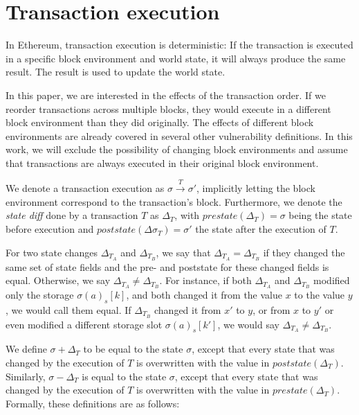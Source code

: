 \documentclass[draft,final]{vutinfth} %
\begin{document}
\section{Transaction execution}

In Ethereum, transaction execution is deterministic: If the transaction is executed in a specific block environment and world state, it will always produce the same result. The result is used to update the world state.

In this paper, we are interested in the effects of the transaction order. If we reorder transactions across multiple blocks, they would execute in a different block environment than they did originally. The effects of different block environments are already covered in several other vulnerability definitions. In this work, we will exclude the possibility of changing block environments and assume that transactions are always executed in their original block environment.

We denote a transaction execution as $\sigma \xrightarrow{T} \sigma\prime$, implicitly letting the block environment correspond to the transaction's block. Furthermore, we denote the \emph{state diff} done by a transaction $T$ as $\Delta_T$, with $prestate(\Delta_T) = \sigma$ being the state before execution and $poststate(\Delta\sigma_T) = \sigma\prime$ the state after the execution of $T$.

For two state changes $\Delta_{T_A}$ and $\Delta_{T_B}$, we say that $\Delta_{T_A} = \Delta_{T_B}$ if they changed the same set of state fields and the pre- and poststate for these changed fields is equal. Otherwise, we say $\Delta_{T_A} \neq \Delta_{T_B}$. For instance, if both $\Delta_{T_A}$ and $\Delta_{T_B}$ modified only the storage $\sigma(a)_s[k]$, and both changed it from the value $x$ to the value $y$, we would call them equal. If $\Delta_{T_B}$ changed it from $x\prime$ to $y$, or from $x$ to $y\prime$ or even modified a different storage slot $\sigma(a)_s[k\prime]$, we would say $\Delta_{T_A} \neq \Delta_{T_B}$.

We define $\sigma + \Delta_T$ to be equal to the state $\sigma$, except that every state that was changed by the execution of $T$ is overwritten with the value in $poststate(\Delta_T)$. Similarly, $\sigma - \Delta_T$ is equal to the state $\sigma$, except that every state that was changed by the execution of $T$ is overwritten with the value in $prestate(\Delta_T)$. Formally, these definitions are as follows:
\end{document}
